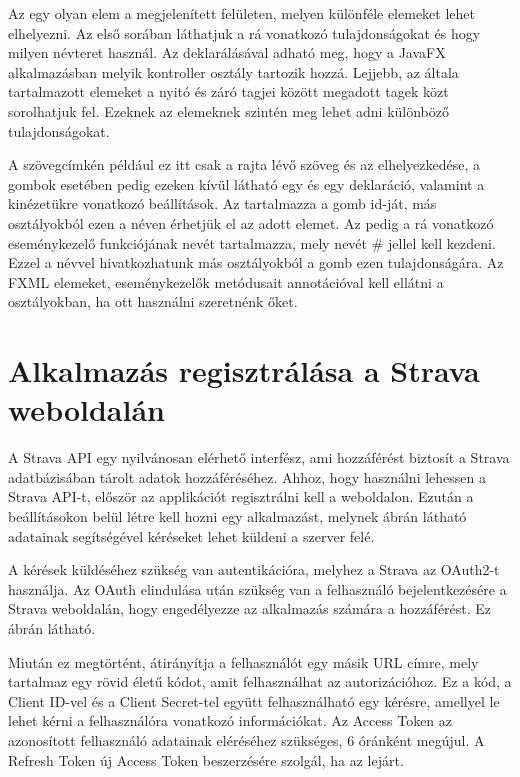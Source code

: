 Az  egy olyan elem a megjelenített felületen, melyen különféle elemeket lehet elhelyezni.
Az első sorában láthatjuk a rá vonatkozó tulajdonságokat és hogy milyen névteret használ.
Az  deklarálásával adható meg, hogy a JavaFX alkalmazásban melyik kontroller osztály tartozik hozzá.
Lejjebb, az általa tartalmazott elemeket a nyitó és záró tagjei között megadott  tagek közt sorolhatjuk fel.
Ezeknek az elemeknek szintén meg lehet adni különböző tulajdonságokat.

A szövegcímkén például ez itt csak a rajta lévő szöveg és az elhelyezkedése, a gombok esetében pedig ezeken kívül látható egy  és egy  deklaráció, valamint a kinézetükre vonatkozó beállítások.
Az  tartalmazza a gomb id-ját, más osztályokból ezen a néven érhetjük el az adott elemet.
Az  pedig a rá vonatkozó eseménykezelő funkciójának nevét tartalmazza, mely nevét \# jellel kell kezdeni.
Ezzel a névvel hivatkozhatunk más osztályokból a gomb ezen tulajdonságára.
Az FXML elemeket, eseménykezelők metódusait  annotációval kell ellátni a  osztályokban, ha ott használni szeretnénk őket.  



\section{Alkalmazás regisztrálása a Strava weboldalán}

A Strava API egy nyilvánosan elérhető interfész, ami hozzáférést biztosít a Strava adatbázisában tárolt adatok hozzáféréséhez.
Ahhoz, hogy használni lehessen a Strava API-t, először az applikációt regisztrálni kell a weboldalon.
Ezután a beállításokon belül létre kell hozni egy alkalmazást, melynek  ábrán látható adatainak segítségével kéréseket lehet küldeni a szerver felé. 


A kérések küldéséhez szükség van autentikációra, melyhez a Strava az OAuth2-t használja.
Az OAuth elindulása után szükség van a felhasználó bejelentkezésére a Strava weboldalán, hogy engedélyezze az alkalmazás számára a hozzáférést.
Ez  ábrán látható. 


Miután ez megtörtént, átirányítja a felhasználót egy másik URL címre, mely tartalmaz egy rövid életű kódot, amit felhasználhat az autorizációhoz.
Ez a kód, a Client ID-vel és a Client Secret-tel együtt felhasználható egy kérésre, amellyel le lehet kérni a felhasználóra vonatkozó információkat.
Az Access Token az azonosított felhasználó adatainak eléréséhez szükséges, 6 óránként megújul.
A Refresh Token új Access Token beszerzésére szolgál, ha az lejárt.

